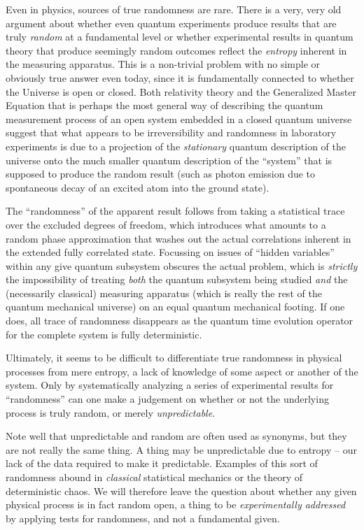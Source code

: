 \documentclass{book}
\begin{document}
Even in physics, sources of true randomness are rare.  There is a very,
very old argument about whether even quantum experiments produce results
that are truly {\em random} at a fundamental level or whether
experimental results in quantum theory that produce seemingly random
outcomes reflect the {\em entropy} inherent in the measuring apparatus.
This is a non-trivial problem with no simple or obviously true answer
even today, since it is fundamentally connected to whether the Universe
is open or closed.  Both relativity theory and the Generalized Master
Equation that is perhaps the most general way of describing the quantum
measurement process of an open system embedded in a closed quantum
universe suggest that what appears to be irreversibility and randomness
in laboratory experiments is due to a projection of the {\em stationary}
quantum description of the universe onto the much smaller quantum
description of the ``system'' that is supposed to produce the random
result (such as photon emission due to spontaneous decay of an excited
atom into the ground state).

The ``randomness'' of the apparent result follows from taking a
statistical trace over the excluded degrees of freedom, which introduces
what amounts to a random phase approximation that washes out the actual
correlations inherent in the extended fully correlated state.  Focussing
on issues of ``hidden variables'' within any give quantum subsystem
obscures the actual problem, which is {\em strictly} the impossibility
of treating {\em both} the quantum subsystem being studied {\em and} the
(necessarily classical) measuring apparatus (which is really the rest of
the quantum mechanical universe) on an equal quantum mechanical footing.
If one does, all trace of randomness disappears as the quantum time
evolution operator for the complete system is fully deterministic.

Ultimately, it seems to be difficult to differentiate true randomness in
physical processes from mere entropy, a lack of knowledge of some aspect
or another of the system.  Only by systematically analyzing a series of
experimental results for ``randomness'' can one make a judgement on
whether or not the underlying process is truly random, or merely {\em
unpredictable}.  

Note well that unpredictable and random are often used as synonyms, but
they are not really the same thing.  A thing may be unpredictable due to
entropy -- our lack of the data required to make it predictable.
Examples of this sort of randomness abound in {\em classical}
statistical mechanics or the theory of deterministic chaos.  We will
therefore leave the question about whether any given physical process is
in fact random open, a thing to be {\em experimentally addressed} by
applying tests for randomness, and not a fundamental given.
\end{document}
